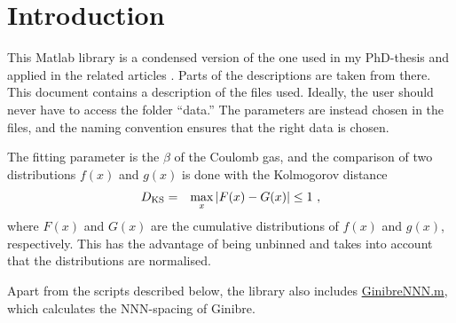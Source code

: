 \documentclass[a4paper,11pt]{article}
\numberwithin{equation}{section}
\begin{document}
\newcommand{\fileBuzzardRead}{\href{run:./Library/Buzzard_Read.m}{Buzzard\_Read.m}}
\newcommand{\fileLiouvilleRead}{\href{run:./Library/Liouville_Spacing.m.m}{Liouville\_Spacing.m}}
\newcommand{\fileCoulombGenerate}{\href{run:./Library/CoulombGasSim.m}{CoulombGasSim.m}}
\newcommand{\fileCoulombDistCalc}{\href{run:./Library/CoulombGasLoad.m}{CoulombGasLoad.m}}
\newcommand{\fileBetaUncertainty}{\href{run:./Library/betaUncertainty.m}{betaUncertainty.m}}
\newcommand{\fileCovCon}{\href{run:./Library/CovCon.m}{CovCon.m}}
\newcommand{\fileGinibreNNN}{\href{run:./Library/GinibreNNN.m}{GinibreNNN.m}}
\newcommand{\fileCutOutBuzz}{\href{run:./Library/CutOutBuzz.m}{CutOutBuzz.m}}
\newcommand{\fileCoulombGasFit}{\href{run:./Library/CoulombGasFit.m}{CoulombGasFit.m}}
\newcommand{\fileCoulombGasFitTwo}{\href{run:./Library/CoulombGasFit2.m}{CoulombGasFit2.m}}
\newcommand{\fileCoulombGasFitTargeted}{\href{run:./Library/CoulombGasFitTargeted.m}{CoulombGasFitTargeted.m}}
\newcommand{\fileCoulombGasFitTwoTargeted}{\href{run:./Library/CoulombGasFit2Targeted.m}{CoulombGasFit2Targeted.m}}
\newcommand{\fileUnfoldingGaussian}{\href{run:./Library/UnfoldingGaussian.m}{UnfoldingGaussian.m}}

\section{Introduction}
This Matlab library is a condensed version of the one used in my PhD-thesis \cite{PhD_AM} and applied in the related articles \cite{AKMP,Buzzard}. Parts of the descriptions are taken from there.
This document contains a description of the files used. Ideally, the user should never have to access the folder ``data.'' The parameters are instead chosen in the files, and the naming convention ensures that the right data is chosen.

The fitting parameter is the $\beta$ of the Coulomb gas, and the comparison of two distributions $f(x)$ and $g(x)$ is done with the Kolmogorov distance
\begin{eqnarray}
D_{\rm KS} &=& \max_x |F(x) - G(x)|\leq 1\ ,
\end{eqnarray}
where $F(x)$ and $G(x)$ are the cumulative distributions of $f(x)$ and $g(x)$,  respectively.
This has the advantage of being unbinned and takes into account that the distributions are normalised.

Apart from the scripts described below, the library also includes \fileGinibreNNN, which calculates the NNN-spacing of Ginibre.
\end{document}
